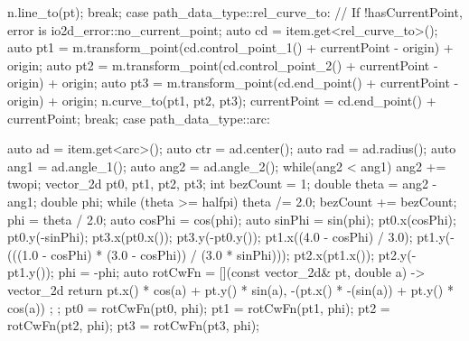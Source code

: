 \begin{codeblock}
{{{    n.line_to(pt);
  } break;
  case path_data_type::rel_curve_to:
  {
    // If !hasCurrentPoint, error is io2d_error::no_current_point;
    auto cd = item.get<rel_curve_to>();
    auto pt1 = m.transform_point(cd.control_point_1() + currentPoint -
      origin) + origin;
    auto pt2 = m.transform_point(cd.control_point_2() + currentPoint -
      origin) + origin;
    auto pt3 = m.transform_point(cd.end_point() + currentPoint - origin) +
      origin;
    n.curve_to(pt1, pt2, pt3);
    currentPoint = cd.end_point() + currentPoint;
  } break;
  case path_data_type::arc:
  {
    auto ad = item.get<arc>();
    auto ctr = ad.center();
    auto rad = ad.radius();
    auto ang1 = ad.angle_1();
    auto ang2 = ad.angle_2();
    while(ang2 < ang1) {
      ang2 += twopi;
    }
    vector_2d pt0, pt1, pt2, pt3;
    int bezCount = 1;
    double theta = ang2 - ang1;
    double phi;
    while (theta >= halfpi) {
      theta /= 2.0;
      bezCount += bezCount;
    }
    phi = theta / 2.0;
    auto cosPhi = cos(phi);
    auto sinPhi = sin(phi);
    pt0.x(cosPhi);
    pt0.y(-sinPhi);
    pt3.x(pt0.x());
    pt3.y(-pt0.y());
    pt1.x((4.0 - cosPhi) / 3.0);
    pt1.y(-(((1.0 - cosPhi) * (3.0 - cosPhi)) / (3.0 * sinPhi)));
    pt2.x(pt1.x());
    pt2.y(-pt1.y());
    phi = -phi;
    auto rotCwFn = [](const vector_2d& pt, double a) -> vector_2d {
      return { pt.x() * cos(a) + pt.y() * sin(a),
        -(pt.x() * -(sin(a)) + pt.y() * cos(a)) };
    };
    pt0 = rotCwFn(pt0, phi);
    pt1 = rotCwFn(pt1, phi);
    pt2 = rotCwFn(pt2, phi);
    pt3 = rotCwFn(pt3, phi);
    
}}}
\end{codeblock}
